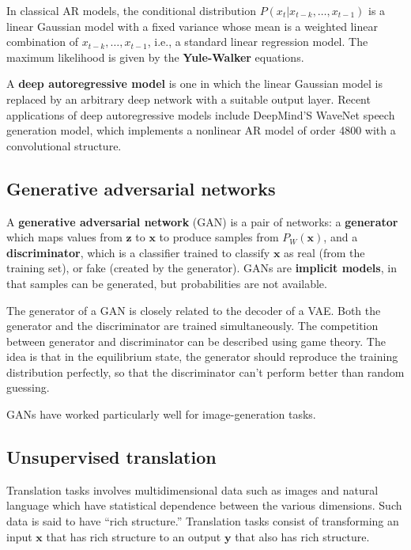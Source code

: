 \documentclass{article}
\renewcommand{\vec}[1]{\textbf{#1}}
\begin{document}
In classical AR models, the conditional distribution $P(x_t | x_{t-k}, \dots, x_{t-1})$
is a linear Gaussian model with a fixed variance whose mean is a weighted
linear combination of $x_{t-k}, \dots, x_{t-1}$, i.e., a standard
linear regression model. The maximum likelihood is given by the
\textbf{Yule-Walker} equations.

A \textbf{deep autoregressive model} is one in which the linear Gaussian
model is replaced by an arbitrary deep network with a suitable output
layer. Recent applications of deep autoregressive models include DeepMind'S
WaveNet speech generation model, which implements a nonlinear AR model 
of order 4800 with a convolutional structure.

\subsection{Generative adversarial networks}

A \textbf{generative adversarial network} (GAN) is a pair of networks: a
\textbf{generator} which maps values from $\vec{z}$ to $\vec{x}$ to produce samples
from $P_W(\vec{x})$, and a \textbf{discriminator}, which is a classifier trained to
classify $\vec{x}$ as real (from the training set), or fake (created by the generator).
GANs are \textbf{implicit models}, in that samples can be generated, but probabilities
are not available. 

The generator of a GAN is closely related to the decoder of a VAE. Both the generator
and the discriminator are trained simultaneously. The competition between generator
and discriminator can be described using game theory. The idea is that in the 
equilibrium state, the generator should reproduce the training distribution perfectly,
so that the discriminator can't perform better than random guessing.

GANs have worked particularly well for image-generation tasks.

\subsection{Unsupervised translation}

Translation tasks involves multidimensional data such as images and natural language 
which have statistical dependence between the various dimensions. Such data is said
to have ``rich structure.'' Translation tasks consist of transforming an input
$\vec{x}$ that has rich structure to an output $\vec{y}$ that also has rich structure.
\end{document}

